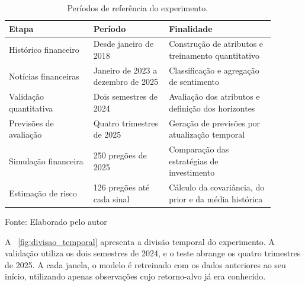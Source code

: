 \begin{table}[H]
\centering
\caption{Períodos de referência do experimento.}
\label{tab:periodos_experimentais}
{\footnotesize
\begin{tabular}{p{0.29\linewidth}p{0.25\linewidth}p{0.35\linewidth}}
\hline
Etapa & Período & Finalidade \\ \hline
Histórico financeiro &
Desde janeiro de 2018 &
Construção de atributos e treinamento quantitativo \\

Notícias financeiras &
Janeiro de 2023 a dezembro de 2025 &
Classificação e agregação de sentimento \\

Validação quantitativa &
Dois semestres de 2024 &
Avaliação dos atributos e definição dos horizontes \\

Previsões de avaliação &
Quatro trimestres de 2025 &
Geração de previsões por atualização temporal \\

Simulação financeira &
250 pregões de 2025 &
Comparação das estratégias de investimento \\

Estimação de risco &
126 pregões até cada sinal &
Cálculo da covariância, do prior e da média histórica \\
\hline
\end{tabular}}
\par
Fonte: Elaborado pelo autor
\end{table}

A ~\ref{fig:divisao_temporal} apresenta a divisão
temporal do experimento. A validação utiliza os dois
semestres de 2024, e o teste abrange os quatro trimestres
de 2025. A cada janela, o modelo é retreinado com os
dados anteriores ao seu início, utilizando apenas
observações cujo retorno-alvo já era conhecido.

